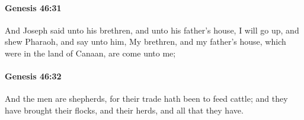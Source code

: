 		\paragraph{Genesis 46:31} %
			\label{GENESIS-46-31}

			And Joseph said unto his brethren, and unto his father's house, I will go up, and shew Pharaoh, and say unto him, My brethren, and my father's house, which were in the land of Canaan, are come unto me;


		\paragraph{Genesis 46:32} %
			\label{GENESIS-46-32}

			And the men are shepherds, for their trade hath been to feed cattle; and they have brought their flocks, and their herds, and all that they have.


